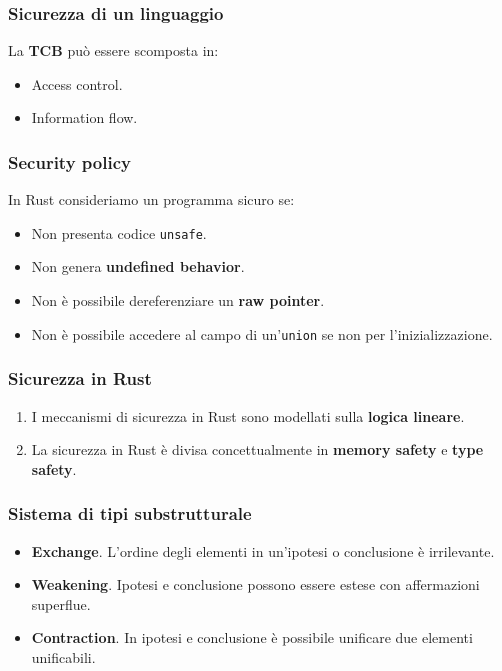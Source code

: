 \documentclass{beamer}
\newcommand{\textcode}[1]{\colorbox{backcolour}{\texttt{#1}}}
\begin{document}
\begin{frame}
    \frametitle{Sicurezza di un linguaggio}
    La \textbf{TCB} può essere scomposta in: 
    \begin{itemize}
        \item Access control.
        \item Information flow.
    \end{itemize}
\end{frame}

\begin{frame}
    \frametitle{Security policy}
    In Rust consideriamo un programma sicuro se:
    \begin{itemize}
        \item Non presenta codice \textcode{unsafe}.
        \item Non genera \textbf{undefined behavior}.
        \item Non è possibile dereferenziare un \textbf{raw pointer}.
        \item Non è possibile accedere al campo di un'\textcode{union} se non per l'inizializzazione.
    \end{itemize}
\end{frame}

\begin{frame}
    \frametitle{Sicurezza in Rust}
    \begin{enumerate}
        \item I meccanismi di sicurezza in Rust sono modellati sulla \textbf{logica lineare}.
        \item La sicurezza in Rust è divisa concettualmente in  \textbf{memory safety} e \textbf{type safety}.
    \end{enumerate} 
\end{frame}

\begin{frame}
    \frametitle{Sistema di tipi substrutturale}
    \begin{itemize}
        \item \textbf{Exchange}. L'ordine degli elementi in un'ipotesi o conclusione è irrilevante. 
        \item \textbf{Weakening}. Ipotesi e conclusione possono essere estese con affermazioni superflue. 
        \item \textbf{Contraction}. In ipotesi e conclusione è possibile unificare due elementi unificabili. 
    \end{itemize} 
\end{frame}
\end{document}
